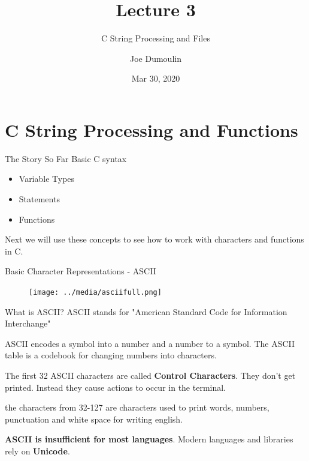 \documentclass[10pt]{beamer}
\title{Lecture 3}
\subtitle{C String Processing and Files}
\date{Mar 30, 2020}
\author{Joe Dumoulin}
\institute{Eastern Washington University}
\begin{document}
\maketitle
\section{C String Processing and Functions} 



\begin{frame}[fragile]{The Story So Far}
Basic C syntax

\begin{itemize}

\item Variable Types
\item Statements
\item Functions

\end{itemize}

Next we will use these concepts to see how to work with characters and functions in C.

\end{frame}
\begin{frame}[fragile]{Basic Character Representations - ASCII}

\begin{figure}[htp]
    \centering
    \texttt{[image: ../media/asciifull.png]}
    \label{fig:ASCII}
\end{figure}


\end{frame}
\begin{frame}[fragile]{What is ASCII?}
ASCII stands for "American Standard Code for Information Interchange"

ASCII encodes a symbol into a number and a number to a symbol.  The ASCII table is a codebook for changing numbers into characters.

The first 32 ASCII characters are called \textbf{Control Characters}.  They don't get printed.  Instead they cause actions to occur in the terminal.

the characters from  32-127 are characters used to print words, numbers, punctuation and white space for writing english.

\textbf{ASCII is insufficient for most languages}.  Modern languages and libraries rely on \textbf{Unicode}.


\end{frame}
\end{document}
